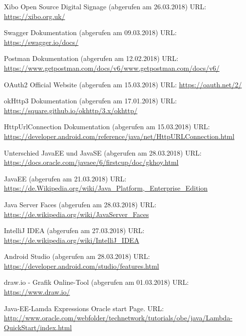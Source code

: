 \begin{thebibliography}{9}

Xibo Open Source Digital Signage (abgerufen am 26.03.2018)
\newblock URL: {\small \url{https://xibo.org.uk/}}

Swagger Dokumentation (abgerufen am 09.03.2018)
\newblock URL: {\small \url{https://swagger.io/docs/}}

Postman Dokumentation (abgerufen am 12.02.2018)
\newblock URL: {\small \url{https://www.getpostman.com/docs/v6/www.getpostman.com/docs/v6/}}

OAuth2 Official Website (abgerufen am 15.03.2018)
\newblock URL: {\small \url{https://oauth.net/2/}}

okHttp3 Dokumentation (abgerufen am 17.01.2018)
\newblock URL: {\small \url{https://square.github.io/okhttp/3.x/okhttp/}}

HttpUrlConnection Dokumentation (abgerufen am 15.03.2018)
\newblock URL: {\small \url{https://developer.android.com/reference/java/net/HttpURLConnection.html}}

Unterschied JavaEE und JavaSE (abgerufen am 28.03.2018)
\newblock URL: {\small \url{https://docs.oracle.com/javaee/6/firstcup/doc/gkhoy.html}}

JavaEE (abgerufen am 21.03.2018)
\newblock URL: {\small \url{https://de.Wikipedia.org/wiki/Java_Platform,_Enterprise_Edition}}

Java Server Faces (abgerufen am 28.03.2018)
\newblock URL: {\small \url{https://de.wikipedia.org/wiki/JavaServer_Faces}}

IntelliJ IDEA (abgerufen am 27.03.2018)
\newblock URL: {\small \url{https://de.wikipedia.org/wiki/IntelliJ_IDEA}}

Android Studio (abgerufen am 28.03.2018)
\newblock URL: {\small \url{https://developer.android.com/studio/features.html}}

draw.io - Grafik Online-Tool (abgerufen am 01.03.2018)
\newblock URL: {\small \url{https://www.draw.io/}}

Java-EE-Lamda Expressions Oracle start Page.
\newblock URL: {\small \url{http://www.oracle.com/webfolder/technetwork/tutorials/obe/java/Lambda-QuickStart/index.html}}
\end{thebibliography}


